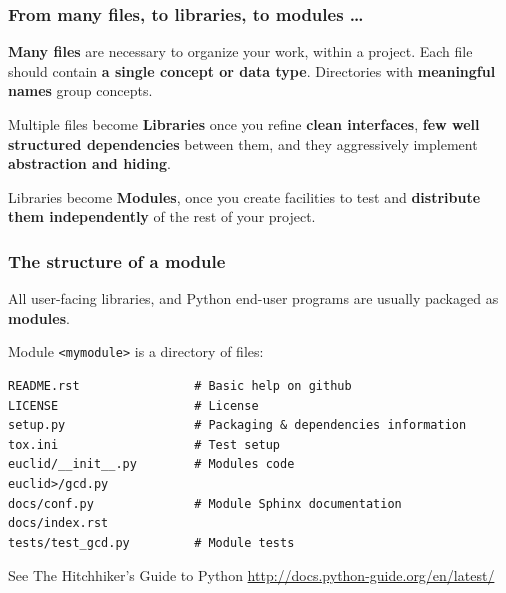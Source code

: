 \documentclass{beamer} %
\newcommand\emc[1]{\textcolor{brightblue}{\textbf{#1}}}
\begin{document}
\begin{frame}

\frametitle{From many files, to libraries, to modules \ldots}

\emc{Many files} are necessary to organize your work, within a project. Each file should contain \emc{a single concept or data type}. Directories with \emc{meaningful names} group concepts.

\vspace{3mm}
Multiple files become \emc{Libraries} once you refine \emc{clean interfaces}, \emc{few well structured dependencies} between them, and they aggressively implement \emc{abstraction and hiding}.

\vspace{3mm}
Libraries become \emc{Modules}, once you create facilities to test and \emc{distribute them independently} of the rest of your project.

\end{frame}


\begin{frame}[fragile]

\frametitle{The structure of a module}

All user-facing libraries, and Python end-user programs are usually packaged as \emc{modules}.

\vspace{3mm}
Module \texttt{<mymodule>} is a directory of files:
\begin{small}
\begin{Verbatim}[fontsize=\footnotesize]
README.rst                # Basic help on github
LICENSE                   # License
setup.py                  # Packaging & dependencies information
tox.ini                   # Test setup
euclid/__init__.py        # Modules code
euclid>/gcd.py
docs/conf.py              # Module Sphinx documentation
docs/index.rst
tests/test_gcd.py         # Module tests
\end{Verbatim}
\end{small}

See The Hitchhiker’s Guide to Python \url{http://docs.python-guide.org/en/latest/}

\end{frame}


\end{document}

